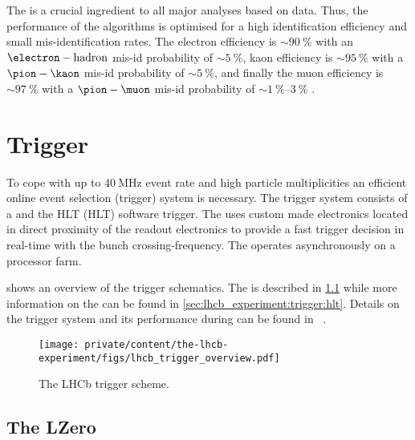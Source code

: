 The \PID is a crucial ingredient to all major analyses based on \LHCb data.
Thus, the performance of the \PID algorithms is optimised for a high
identification efficiency and small mis-identification rates. The electron \PID
efficiency is $\sim\SI{90}{\percent}$ with an $\electron-\text{hadron}$ mis-id
probability of $\sim\SI{5}{\percent}$, kaon \PID efficiency is
$\sim\SI{95}{\percent}$ with a $\pion-\kaon$ mis-id probability of
$\sim\SI{5}{\percent}$, and finally the muon \PID efficiency is
$\sim\SI{97}{\percent}$ with a $\pion-\muon$ mis-id probability of
$\sim\SIrange[range-phrase = -,range-units = single]{1}{3}{\percent}$
\cite{Aaij:2014jba,Archilli:2013npa}.

\section{Trigger}
\label{sec:lhcb_experiment:trigger}

To cope with up to $\SI{40}{\mega\hertz}$ event rate and high particle
multiplicities an efficient online event selection (trigger) system is
necessary. The \LHCb trigger system consists of a \LZero and the \acs{HLT}
(\acl{HLT}) software trigger. The \LZero uses custom made electronics located in
direct proximity of the readout electronics to provide a fast trigger decision
in real-time with the bunch crossing-frequency. The \HLT operates asynchronously
on a processor farm.

 shows an overview of the \LHCb
trigger schematics. The \LZero is described in
\cref{sec:lhcb_experiment:trigger:lzero} while more information on the \HLT can
be found in \cref{sec:lhcb_experiment:trigger:hlt}. Details on the \LHCb trigger
system and its performance during \RunOne can be found in
\Refs~\cite{Aaij:2012me,Albrecht:2013fba}.
%
\begin{figure}[t]
  \centering
  \texttt{[image: private/content/the-lhcb-experiment/figs/lhcb\_trigger\_overview.pdf]}
  \caption{
    The \acs{LHCb} \RunOne trigger scheme.
  }
  \label{fig:lhcb_experiment:trigger:overview}
\end{figure}

\subsection{The \acl*{LZero}}
\label{sec:lhcb_experiment:trigger:lzero}

